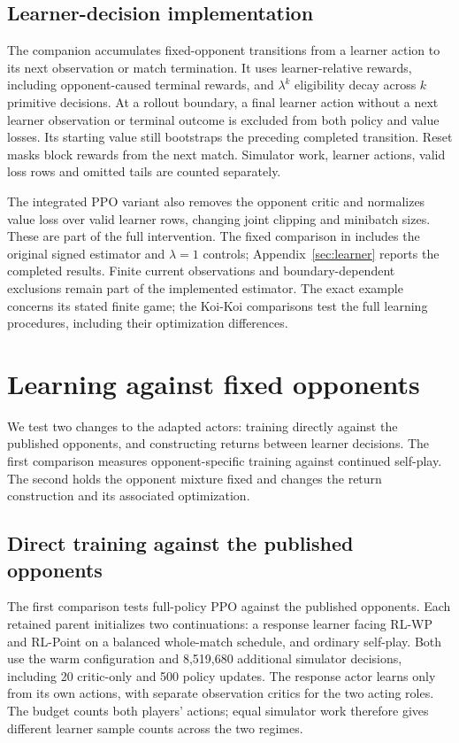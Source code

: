 \documentclass[11pt]{article}
\begin{document}
\subsection{Learner-decision implementation}

The companion  accumulates fixed-opponent
transitions from a learner action to its next observation or match termination.
It uses learner-relative rewards, including opponent-caused terminal rewards,
and $\lambda^k$ eligibility decay across $k$ primitive decisions. At a rollout
boundary, a final learner action without a next learner observation or terminal
outcome is excluded from both policy and value losses. Its starting value still
bootstraps the preceding completed transition. Reset masks block rewards from
the next match. Simulator work, learner actions, valid loss rows and omitted
tails are counted separately.

The integrated PPO variant also removes the opponent critic and normalizes
value loss over valid learner rows, changing joint clipping and minibatch sizes.
These are part of the full intervention. The fixed comparison in
 includes the original signed estimator and
$\lambda=1$ controls; Appendix~\ref{sec:learner} reports the completed results.
Finite current observations and boundary-dependent exclusions remain part of
the implemented estimator. The exact example concerns its stated finite game;
the Koi-Koi comparisons test the full learning procedures, including their
optimization differences.

\section{Learning against fixed opponents}
\label{sec:training}
We test two changes to the adapted actors: training directly against the
published opponents, and constructing returns between learner decisions.
The first comparison measures opponent-specific training against continued
self-play. The second holds the opponent mixture fixed and changes the return
construction and its associated optimization.

\subsection{Direct training against the published opponents}
\label{sec:response}
The first comparison tests full-policy PPO against the published opponents.
Each retained parent initializes two continuations: a response learner facing
RL-WP and RL-Point on a balanced whole-match schedule, and ordinary self-play.
Both use the warm configuration and 8,519,680 additional simulator decisions,
including 20 critic-only and 500 policy updates. The response actor learns only
from its own actions, with separate observation critics for the two acting roles.
The budget counts both players' actions; equal simulator work therefore gives
different learner sample counts across the two regimes.
\end{document}
